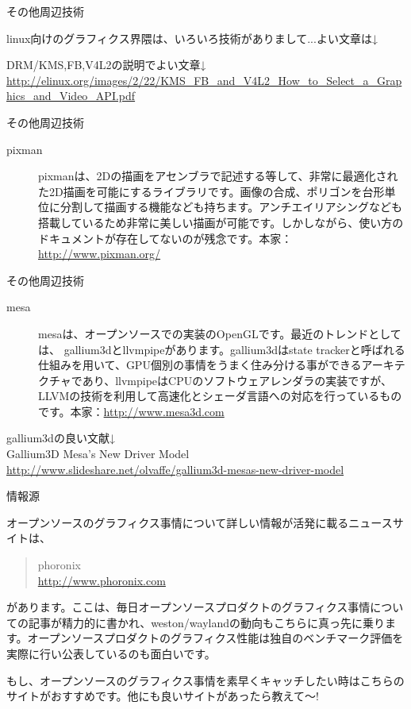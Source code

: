 \begin{frame}{その他周辺技術}
 
 linux向けのグラフィクス界隈は、いろいろ技術がありまして...よい文章は↓

\begin{center}
DRM/KMS,FB,V4L2の説明でよい文章↓\\
\url{http://elinux.org/images/2/22/KMS_FB_and_V4L2_How_to_Select_a_Graphics_and_Video_API.pdf}
\end{center}

\end{frame}

\begin{frame}{その他周辺技術}

\begin{description}
\item [pixman] pixmanは、2Dの描画をアセンブラで記述する等して、非常に最適化された2D描画を可能にするライブラリです。画像の合成、ポリゴンを台形単位に分割して描画する機能なども持ちます。アンチエイリアシングなども搭載しているため非常に美しい描画が可能です。しかしながら、使い方のドキュメントが存在してないのが残念です。本家：\url{http://www.pixman.org/}
\end{description}

\end{frame}

\begin{frame}{その他周辺技術}

\begin{description}
\item [mesa] mesaは、オープンソースでの実装のOpenGLです。最近のトレンドとしては、
gallium3dとllvmpipeがあります。gallium3dはstate trackerと呼ばれる仕組みを用いて、GPU個別の事情をうまく住み分ける事ができるアーキテクチャであり、llvmpipeはCPUのソフトウェアレンダラの実装ですが、LLVMの技術を利用して高速化とシェーダ言語への対応を行っているものです。本家：\url{http://www.mesa3d.com}
\end{description}

gallium3dの良い文献↓\\
Gallium3D Mesa's New Driver Model\\
\url{http://www.slideshare.net/olvaffe/gallium3d-mesas-new-driver-model}
\end{frame}



\begin{frame}{情報源}

 オープンソースのグラフィクス事情について詳しい情報が活発に載るニュースサイトは、
\begin{quote}
phoronix\\
\url{http://www.phoronix.com}
\end{quote}
があります。ここは、毎日オープンソースプロダクトのグラフィクス事情についての記事が精力的に書かれ、weston/waylandの動向もこちらに真っ先に乗ります。オープンソースプロダクトのグラフィクス性能は独自のベンチマーク評価を実際に行い公表しているのも面白いです。

もし、オープンソースのグラフィクス事情を素早くキャッチしたい時はこちらのサイトがおすすめです。他にも良いサイトがあったら教えて〜!
\end{frame}

